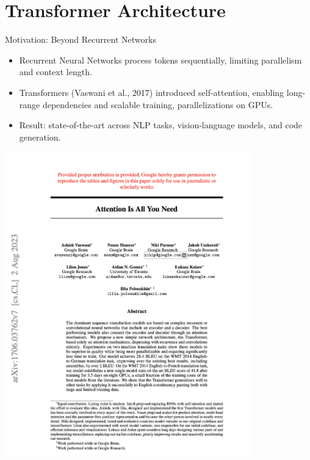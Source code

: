 \documentclass[aspectratio=169]{beamer}
\begin{document}
\section{Transformer Architecture}

\begin{frame}{Motivation: Beyond Recurrent Networks}
  \begin{minipage}
[c]{0.45\textwidth}
\begin{itemize}
    \item Recurrent Neural Networks process tokens sequentially, limiting parallelism and context length.
    \item Transformers (Vaswani et al., 2017) introduced self-attention, enabling long-range dependencies and scalable training, parallelizations on GPUs.
    \item Result: state-of-the-art across NLP tasks, vision-language models, and code generation.
  \end{itemize}
  \end{minipage}
\begin{minipage}
[c]{0.45\textwidth}
  \centering
  \includegraphics[width=0.8\textwidth]{attentionIsAllYouNeed.png}
\end{minipage}

\end{frame}
\end{document}

